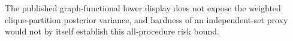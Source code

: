 The published graph-functional lower display does not expose the weighted clique-partition posterior variance, and hardness of an independent-set proxy would not by itself establish this all-procedure risk bound.